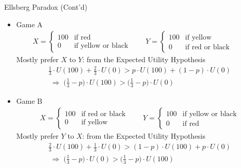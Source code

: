 \documentclass[10pt]{beamer}
\newcommand{\ie}{\;\Longrightarrow\;}
\begin{document}
\begin{frame}{Ellsberg Paradox (Cont'd)}
  \begin{itemize}[<+->]\setlength\itemsep{0em}
    \item Game A  
      \begin{align*}
        X = \begin{cases}100 & \text{if red}\\0 & \text{if yellow or black}\end{cases} \qquad
        Y = \begin{cases}100 & \text{if yellow}\\0 & \text{if red or black}\end{cases} \qquad
      \end{align*}
      \onslide<+->
      Mostly prefer $X$ to $Y$: from the Expected Utility Hypothesis 
      \onslide<+->
      \begin{multline}
        \frac{1}{3}\cdot U(100) + \frac{2}{3}\cdot U(0) > p\cdot U(100) + (1 - p)\cdot U(0) \\ \ie\big(\frac{1}{3} - p\big)\cdot U(100) > \big(\frac{1}{3} - p\big)\cdot U(0)
      \end{multline}
    \item Game B 
      \begin{align*}
        X = \begin{cases}100 & \text{if red or black}\\ 0 & \text{if yellow}\end{cases} \qquad
        Y = \begin{cases}100 & \text{if yellow or black}\\ 0 & \text{if red}\end{cases}
      \end{align*}
      \onslide<+->
      Mostly prefer $Y$ to $X$: from the Expected Utility Hypothesis 
      \onslide<+->
      \begin{multline}
        \frac{2}{3}\cdot U(100) + \frac{1}{3}\cdot U(0) > (1 - p)\cdot U(100) + p\cdot U(0) \\ \ie\big(\frac{1}{3} - p\big)\cdot U(0) > \big(\frac{1}{3} - p\big)\cdot U(100)
      \end{multline}
  \end{itemize}
\end{frame}
\end{document}
